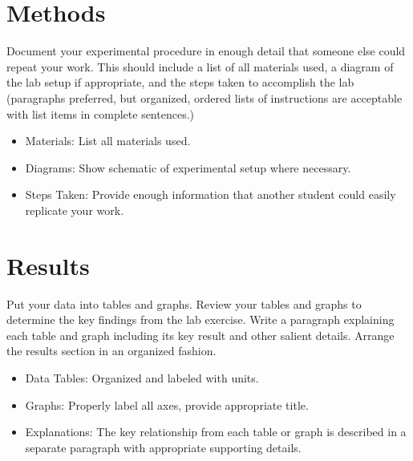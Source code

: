 \documentclass[
    10pt,aps,prl,
    amsfonts,
    amssymb,
    amsmath,
    runinaddress,
    secnum,
    showkeys,
    superscriptaddress,
    twocolumn,
]{revtex4}
\begin{document}
\section{Methods}
    \label{sec:methods}

    Document your experimental procedure in enough detail that someone
        else could repeat your work. 
    This should include a list of all materials used, a diagram of the
        lab setup if appropriate, and the steps taken to accomplish the
        lab (paragraphs preferred, but organized, ordered lists of
        instructions are acceptable with list items in complete sentences.)

    \begin{itemize}
        \item Materials: List all materials used.
        \item Diagrams: Show schematic of experimental setup where necessary.
        \item Steps Taken: Provide enough information that another student
                could easily replicate your work.
    \end{itemize}


\section{Results}
    \label{sec:results}

    Put your data into tables and graphs. 
    Review your tables and graphs to determine the key findings from the
        lab exercise. 
    Write a paragraph explaining each table and graph including its key
        result and other salient details.
    Arrange the results section in an organized fashion.
    \begin{itemize}
        \item Data Tables: Organized and labeled with units.
        \item Graphs: Properly label all axes, provide appropriate title.
        \item Explanations: The key relationship from each table or graph
                 is described in a separate paragraph with appropriate 
                 supporting details.
    \end{itemize}
\end{document}

